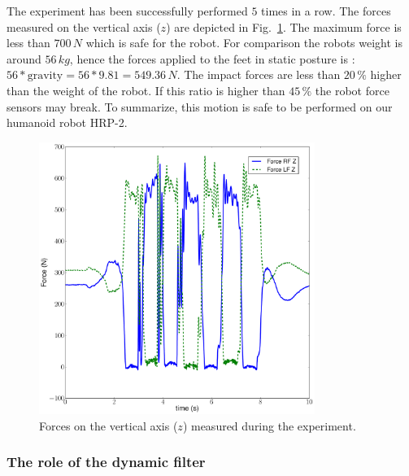 The experiment has been successfully performed $5$ times in a row.
The forces measured on the vertical axis ($z$) are depicted in Fig.~\ref{fig:zforces}.
The maximum force is less than $700\,N$ which is safe for the robot.
For comparison the robots weight is around $56\,kg$, hence the forces applied to the feet in static posture is : $56*\text{gravity} = 56*9.81 = 549.36\,N$.
The impact forces are less than $20\,\%$ higher than the weight of the robot.
If this ratio is higher than $45\,\%$ the robot force sensors may break.
To summarize, this motion is safe to be performed on our humanoid robot HRP-2.
%
\begin{figure}[ht]
  \begin{center}
      \includegraphics[height=0.6\textwidth , width=0.8\textwidth ]{forcez.pdf}
      \caption{Forces on the vertical axis ($z$) measured during the experiment.}
      \label{fig:zforces}
  \end{center}
\end{figure}
\subsubsection{The role of the dynamic filter}

